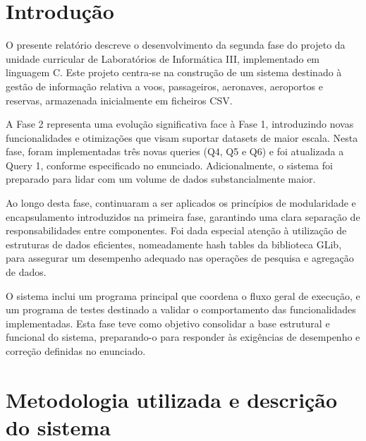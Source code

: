 \documentclass[a4paper,12pt]{scrreprt}
\begin{document}
\makecover %

\renewenvironment{abstract}
 {\par\noindent\textbf{\Large\abstractname}\par\bigskip}
 {}

\pagebreak

\renewcommand{\contentsname}{Índice}
\tableofcontents
\pagebreak


\chapter{Introdução}

O presente relatório descreve o desenvolvimento da segunda fase do projeto da unidade curricular de Laboratórios de Informática III, implementado em linguagem C. Este projeto centra-se na construção de um sistema destinado à gestão de informação relativa a voos, passageiros, aeronaves, aeroportos e reservas, armazenada inicialmente em ficheiros CSV.

A Fase 2 representa uma evolução significativa face à Fase 1, introduzindo novas funcionalidades e otimizações que visam suportar datasets de maior escala. Nesta fase, foram implementadas três novas queries (Q4, Q5 e Q6) e foi atualizada a Query 1, conforme especificado no enunciado. Adicionalmente, o sistema foi preparado para lidar com um volume de dados substancialmente maior.

Ao longo desta fase, continuaram a ser aplicados os princípios de modularidade e encapsulamento introduzidos na primeira fase, garantindo uma clara separação de responsabilidades entre componentes. Foi dada especial atenção à utilização de estruturas de dados eficientes, nomeadamente hash tables da biblioteca GLib, para assegurar um desempenho adequado nas operações de pesquisa e agregação de dados.

O sistema inclui um programa principal que coordena o fluxo geral de execução, e um programa de testes destinado a validar o comportamento das funcionalidades implementadas. Esta fase teve como objetivo consolidar a base estrutural e funcional do sistema, preparando-o para responder às exigências de desempenho e correção definidas no enunciado.


\chapter{Metodologia utilizada e descrição do sistema}
\end{document}

